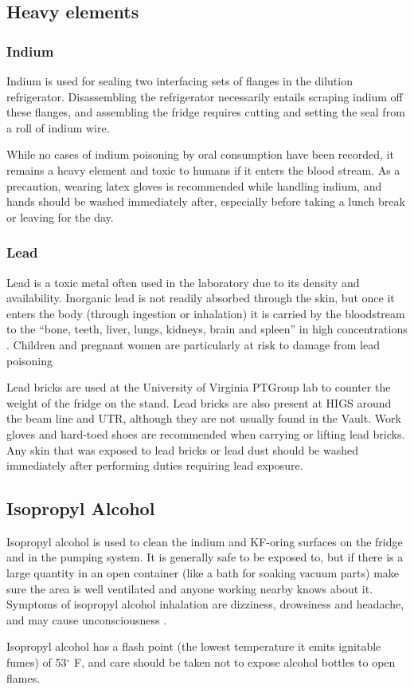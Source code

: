 \subsection{Heavy elements}
\subsubsection{Indium}
Indium is used for sealing two interfacing sets of flanges in the dilution refrigerator.  Disassembling the refrigerator necessarily entails scraping indium off these flanges, and assembling the fridge requires cutting and setting the seal from a roll of indium wire.

While no cases of indium poisoning by oral consumption have been recorded, it remains a heavy element and toxic to humans if it enters the blood stream.  As a precaution, wearing latex gloves is recommended while handling indium, and hands should be washed immediately after, especially before taking a lunch break or leaving for the day.

\subsubsection{Lead}
Lead is a toxic metal often used in the laboratory due to its density and availability.  Inorganic lead is not readily absorbed through the skin, but once it enters the body (through ingestion or inhalation) it is carried by the bloodstream to the ``bone, teeth, liver, lungs, kidneys, brain and spleen'' in high concentrations \cite{aafp98}.  Children and pregnant women are particularly at risk to damage from lead poisoning \cite{epa13}


Lead bricks are used at the University of Virginia PTGroup lab to counter the weight of the fridge on the stand.  Lead bricks are also present at HIGS around the beam line and UTR, although they are not usually found in the Vault.  Work gloves and hard-toed shoes are recommended when carrying or lifting lead bricks.  Any skin that was exposed to lead bricks or lead dust should be washed immediately after performing duties requiring lead exposure.

\subsection{Isopropyl Alcohol}
Isopropyl alcohol is used to clean the indium and KF-oring surfaces on the fridge and in the pumping system.  It is generally safe to be exposed to, but if there is a large quantity in an open container (like a bath for soaking vacuum parts) make sure the area is well ventilated and anyone working nearby knows about it.  Symptoms of isopropyl alcohol inhalation are dizziness, drowsiness and headache, and may cause unconsciousness \cite{isopropmsds}. 

Isopropyl alcohol has a flash point (the lowest temperature it emits ignitable fumes) of 53$^\circ$ F, and care should be taken not to expose alcohol bottles to open flames.
